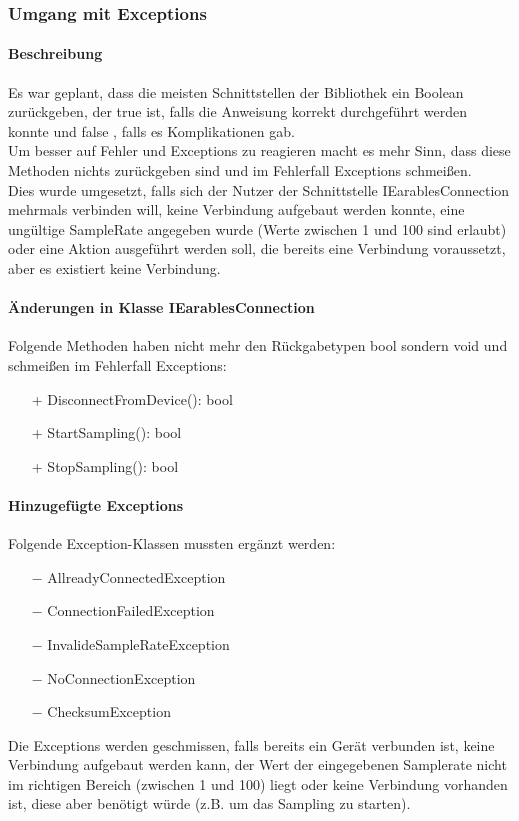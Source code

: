 \documentclass[a4paper,12pt]{article}
\begin{document}
\subsubsection{Umgang mit Exceptions}
\paragraph{Beschreibung}
Es war geplant, dass die meisten Schnittstellen der Bibliothek ein Boolean zurückgeben, der true ist, falls die Anweisung korrekt durchgeführt werden konnte und false , falls es Komplikationen gab.\\
Um besser auf Fehler und Exceptions zu reagieren macht es mehr Sinn, dass diese Methoden nichts zurückgeben sind und im Fehlerfall Exceptions schmeißen.\\
Dies wurde umgesetzt, falls sich der Nutzer der Schnittstelle IEarablesConnection mehrmals verbinden will, keine Verbindung aufgebaut werden konnte, eine ungültige SampleRate angegeben wurde (Werte zwischen 1 und 100 sind erlaubt) oder eine Aktion ausgeführt werden soll, die bereits eine Verbindung voraussetzt, aber es existiert keine Verbindung.

\paragraph{Änderungen in Klasse IEarablesConnection}
Folgende Methoden haben nicht mehr den Rückgabetypen bool sondern void und schmeißen im Fehlerfall Exceptions:
\begin{itemize}
	\item[+] DisconnectFromDevice(): bool
	\item[+] StartSampling(): bool
	\item[+] StopSampling(): bool
\end{itemize} 
\paragraph{Hinzugefügte Exceptions}
Folgende Exception-Klassen mussten ergänzt werden:
\begin{itemize}
	\item[$-$] AllreadyConnectedException
	\item[$-$] ConnectionFailedException
	\item[$-$] InvalideSampleRateException
	\item[$-$] NoConnectionException
	\item[$-$] ChecksumException %
\end{itemize}
Die Exceptions werden geschmissen, falls bereits ein Gerät verbunden ist, keine Verbindung aufgebaut werden kann, der Wert der eingegebenen Samplerate nicht im richtigen Bereich (zwischen 1 und 100) liegt oder keine Verbindung vorhanden ist, diese aber benötigt würde (z.B. um das Sampling zu starten).
\end{document}
